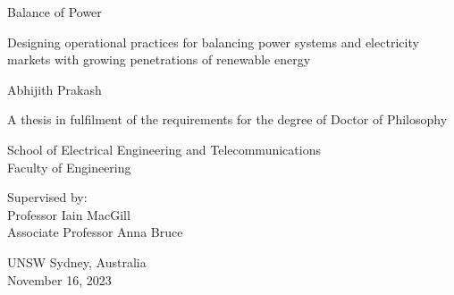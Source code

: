 \documentclass[12pt,a4paper,]{report}
\begin{document}
\begin{titlepage}
    \begin{center}


        \vspace*{2.5cm}

        \huge
        Balance of Power

                \vspace{.5cm}

        \Large
        Designing operational practices for balancing power systems and
        electricity markets with growing penetrations of renewable
        energy
        

        \vspace{1.5cm}

        \Large
        Abhijith Prakash

        \vspace{1.5cm}

        \normalsize
        A thesis in fulfilment of the requirements for the degree of Doctor
of Philosophy

        \vfill

        \normalsize
        School of Electrical Engineering and Telecommunications\\
        Faculty of Engineering\\

        \vfill

        \normalsize
        Supervised by:\\
        Professor Iain MacGill \\ Associate Professor Anna Bruce

        \vspace{0.8cm}


        \normalsize
        UNSW Sydney, Australia\\
        November 16, 2023


    \end{center}
\end{titlepage}
\end{document}
